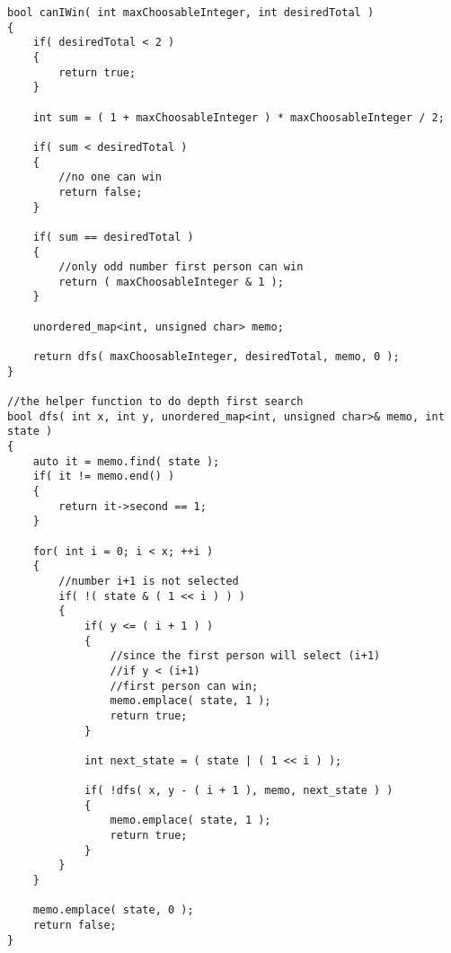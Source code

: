 \setcounter{lstlisting}{0}
\begin{lstlisting}[style=customc, caption={List And Hash Map}]
bool canIWin( int maxChoosableInteger, int desiredTotal )
{
    if( desiredTotal < 2 )
    {
        return true;
    }

    int sum = ( 1 + maxChoosableInteger ) * maxChoosableInteger / 2;

    if( sum < desiredTotal )
    {
        //no one can win
        return false;
    }

    if( sum == desiredTotal )
    {
        //only odd number first person can win
        return ( maxChoosableInteger & 1 );
    }

    unordered_map<int, unsigned char> memo;

    return dfs( maxChoosableInteger, desiredTotal, memo, 0 );
}

//the helper function to do depth first search
bool dfs( int x, int y, unordered_map<int, unsigned char>& memo, int state )
{
    auto it = memo.find( state );
    if( it != memo.end() )
    {
        return it->second == 1;
    }

    for( int i = 0; i < x; ++i )
    {
        //number i+1 is not selected
        if( !( state & ( 1 << i ) ) )
        {
            if( y <= ( i + 1 ) )
            {
                //since the first person will select (i+1)
                //if y < (i+1)
                //first person can win;
                memo.emplace( state, 1 );
                return true;
            }

            int next_state = ( state | ( 1 << i ) );

            if( !dfs( x, y - ( i + 1 ), memo, next_state ) )
            {
                memo.emplace( state, 1 );
                return true;
            }
        }
    }

    memo.emplace( state, 0 );
    return false;
}
\end{lstlisting}
